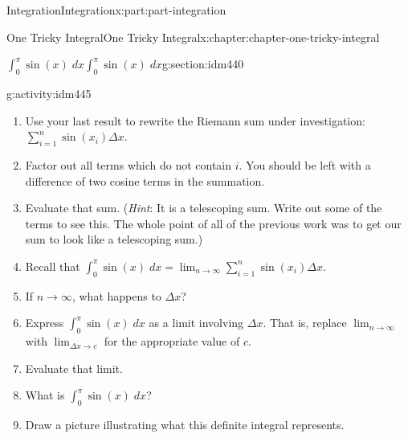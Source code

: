 \documentclass[oneside,10pt,]{book}
\begin{document}
\begin{partptx}{Integration}{}{Integration}{}{}{x:part:part-integration}
\begin{chapterptx}{One Tricky Integral}{}{One Tricky Integral}{}{}{x:chapter:chapter-one-tricky-integral}
\begin{sectionptx}{\(\displaystyle \int_0^\pi \sin(x) \; dx\)}{}{\(\displaystyle \int_0^\pi \sin(x) \; dx\)}{}{}{g:section:idm440}
\begin{activity}{}{g:activity:idm445}
\begin{enumerate}[font=\bfseries,label=(\alph*),ref=\alph*]
\item{}Use your last result to rewrite the Riemann sum under investigation: \(\displaystyle \sum_{i=1}^n \sin(x_i) \Delta x\).%
\item{}Factor out all terms which do not contain \(i\). You should be left with a difference of two cosine terms in the summation.%
\item{}Evaluate that sum. (\emph{Hint}: It is a telescoping sum. Write out some of the terms to see this. The whole point of all of the previous work was to get our sum to look like a telescoping sum.)%
\item{}Recall that \(\displaystyle \int_0^\pi \sin(x) \;dx = \lim_{n \to \infty} \sum_{i=1}^n \sin(x_i) \Delta x\).%
\item{}If \(n \to \infty\), what happens to \(\Delta x\)?%
\item{}Express \(\displaystyle \int_0^\pi \sin(x) \; dx\) as a limit involving \(\Delta x\). That is, replace \(\displaystyle \lim_{n \to \infty}\) with \(\displaystyle \lim_{\Delta x \to c}\) for the appropriate value of \(c\).%
\item{}Evaluate that limit.%
\item{}What is \(\displaystyle \int_0^\pi \sin(x) \; dx\)?%
\item{}Draw a picture illustrating what this definite integral represents.%
\end{enumerate}
\end{activity}
\end{sectionptx}
\end{chapterptx}
\end{partptx}
\end{document}
